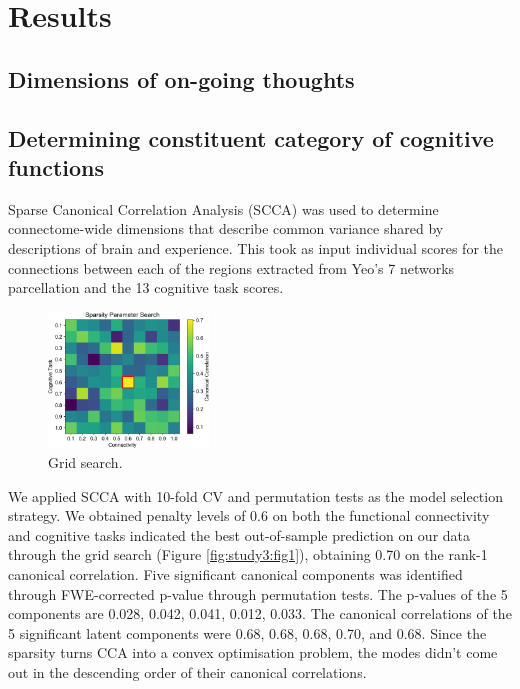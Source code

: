 \section{Results}
\label{study3:results}

\subsection{Dimensions of on-going thoughts}



\subsection{Determining constituent category of cognitive functions}

Sparse Canonical Correlation Analysis (SCCA) was used to determine connectome-wide dimensions that describe common variance shared by descriptions of brain and experience. This took as input individual scores for the connections between each of the regions extracted from Yeo’s 7 networks parcellation and the 13 cognitive task scores.

\begin{figure}
    \vspace{-10pt}
    \centering
    \includegraphics[width=0.38\textwidth]{study3/image/study3fig2.png}
	\caption{Grid search.}
	\label{fig:study3:fig2}
	\vspace{-20pt}
\end{figure}

We applied SCCA with 10-fold CV and permutation tests as the model selection strategy. We obtained penalty levels of 0.6 on both the functional connectivity and cognitive tasks indicated the best out-of-sample prediction on our data through the grid search (Figure \ref{fig:study3:fig1}), obtaining 0.70 on the rank-1 canonical correlation. Five significant canonical components was identified through FWE-corrected p-value through permutation tests. The p-values of the 5 components are 0.028, 0.042, 0.041, 0.012, 0.033. The canonical correlations of the 5 significant latent components were 0.68, 0.68, 0.68, 0.70, and 0.68. Since the sparsity turns CCA into a convex optimisation problem, the modes didn't come out in the descending order of their canonical correlations.

